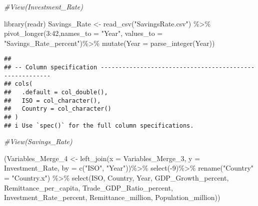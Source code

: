 \documentclass[
]{article}
\newenvironment{Shaded}{\begin{snugshade}}{\end{snugshade}}
\newcommand{\AttributeTok}[1]{\textcolor[rgb]{0.77,0.63,0.00}{#1}}
\newcommand{\CommentTok}[1]{\textcolor[rgb]{0.56,0.35,0.01}{\textit{#1}}}
\newcommand{\DecValTok}[1]{\textcolor[rgb]{0.00,0.00,0.81}{#1}}
\newcommand{\FunctionTok}[1]{\textcolor[rgb]{0.00,0.00,0.00}{#1}}
\newcommand{\NormalTok}[1]{#1}
\newcommand{\OtherTok}[1]{\textcolor[rgb]{0.56,0.35,0.01}{#1}}
\newcommand{\SpecialCharTok}[1]{\textcolor[rgb]{0.00,0.00,0.00}{#1}}
\newcommand{\StringTok}[1]{\textcolor[rgb]{0.31,0.60,0.02}{#1}}
\begin{document}
\begin{Shaded}
\begin{Highlighting}[]
\CommentTok{\#View(Investment\_Rate)}


\FunctionTok{library}\NormalTok{(readr)}
\NormalTok{Savings\_Rate }\OtherTok{\textless{}{-}} \FunctionTok{read\_csv}\NormalTok{(}\StringTok{"SavingsRate.csv"}\NormalTok{) }\SpecialCharTok{\%\textgreater{}\%}
  \FunctionTok{pivot\_longer}\NormalTok{(}\DecValTok{3}\SpecialCharTok{:}\DecValTok{42}\NormalTok{,}\AttributeTok{names\_to =} \StringTok{"Year"}\NormalTok{, }\AttributeTok{values\_to =} \StringTok{"Savings\_Rate\_percent"}\NormalTok{)}\SpecialCharTok{\%\textgreater{}\%}
  \FunctionTok{mutate}\NormalTok{(}\AttributeTok{Year =} \FunctionTok{parse\_integer}\NormalTok{(Year))}
\end{Highlighting}
\end{Shaded}

\begin{verbatim}
## 
## -- Column specification --------------------------------------------------------
## cols(
##   .default = col_double(),
##   ISO = col_character(),
##   Country = col_character()
## )
## i Use `spec()` for the full column specifications.
\end{verbatim}

\begin{Shaded}
\begin{Highlighting}[]
\CommentTok{\#View(Savings\_Rate)}


\NormalTok{(Variables\_Merge\_4 }\OtherTok{\textless{}{-}} \FunctionTok{left\_join}\NormalTok{(}\AttributeTok{x =}\NormalTok{ Variables\_Merge\_3, }\AttributeTok{y =}\NormalTok{ Investment\_Rate, }\AttributeTok{by =} \FunctionTok{c}\NormalTok{(}\StringTok{"ISO"}\NormalTok{, }\StringTok{"Year"}\NormalTok{))}\SpecialCharTok{\%\textgreater{}\%}
  \FunctionTok{select}\NormalTok{(}\SpecialCharTok{{-}}\DecValTok{9}\NormalTok{)}\SpecialCharTok{\%\textgreater{}\%}
  \FunctionTok{rename}\NormalTok{(}\StringTok{"Country"} \OtherTok{=} \StringTok{"Country.x"}\NormalTok{) }\SpecialCharTok{\%\textgreater{}\%}
  \FunctionTok{select}\NormalTok{(ISO, Country, Year, GDP\_Growth\_percent, Remittance\_per\_capita, Trade\_GDP\_Ratio\_percent, Investment\_Rate\_percent, Remittance\_million, Population\_million))}
\end{Highlighting}
\end{Shaded}
\end{document}

